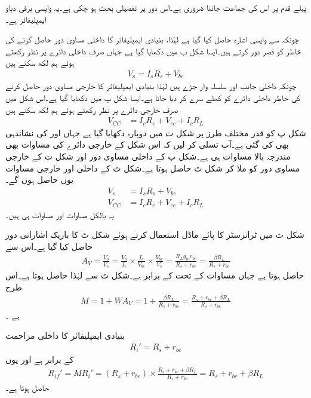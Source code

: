 پہلے قدم پر اس کی جماعت جاننا ضروری ہے۔اس دور پر تفصیلی بحث ہو چکی ہے۔یہ واپسی برقی دباو ایمپلیفائر ہے۔

چونکہ  سے واپسی اشارہ حاصل کیا گیا ہے لہٰذا، بنیادی ایمپلیفائر کا داخلی مساوی دور حاصل کرنے کی خاطر  کو قصر دور کرتے ہیں۔ایسا شکل  ب میں دکھایا گیا ہے جہاں صرف داخلی دائرے پر نظر رکھتے ہوئے ہم لکھ سکتے ہیں
\begin{align} \label{مساوات_واپسی_برقی_دباو_داخلی_مساوی}
V_s = I_s R_s +V_{be}
\end{align}
چونکہ داخلی جانب  اور  سلسلہ وار جڑے ہیں لہٰذا بنیادی ایمپلیفائر کا خارجی مساوی دور حاصل کرنے کی خاطر داخلی دائرے کو کھلے سرے کر دیا جاتا ہے۔ایسا شکل  پ میں دکھایا گیا ہے۔اس شکل میں صرف خارجی دائرے پر نظر رکھتے ہوئے ہم لکھ سکتے ہیں
\begin{align} \label{مساوات_واپسی_برقی_دباو_خارجی_مساوی}
V_{CC} &= I_c R_c+V_{ce}+I_c R_L 
\end{align}
شکل  پ کو قدر مختلف طرز پر شکل  ت میں دوبارہ دکھایا گیا ہے جہاں  اور  کی نشاندہی بھی کی گئی ہے۔آپ تسلی کر لیں کہ اس شکل کے 
خارجی دائرے کی مساوات  بھی مندرجہ بالا مساوات ہی ہے۔شکل  ب کے داخلی مساوی دور اور شکل  ت کے خارجی مساوی دور کو ملا کر شکل  ٹ حاصل ہوتا ہے۔شکل  ٹ کے داخلی اور خارجی مساوات یوں حاصل ہوں گے۔
\begin{align}
V_s &= I_s R_s +V_{be}\\
V_{CC} &= I_c R_c+V_{ce}+I_c R_L
\end{align}
یہ بالکل مساوات  اور مساوات  ہی ہیں۔

شکل  ث میں ٹرانزسٹر کا پائے ماڈل استعمال کرتے ہوئے شکل  ٹ کا باریک اشاراتی دور حاصل کیا گیا ہے۔اس سے
\begin{align} \label{مساوات_واپسی_ٹرانزسٹر_تابع_مخارج_افزائش}
A_V=\frac{V_o}{V_s}=\frac{V_o}{I_c} \times \frac{I_c}{V_{be}} \times \frac{V_{be}}{V_s}=\frac{R_L g_m r_{be}}{R_s+r_{be}}=\frac{\beta R_L}{R_s+r_{be}}
\end{align}
حاصل ہوتا ہے جہاں مساوات  کے تحت  کے برابر ہے۔شکل  ٹ سے    لہٰذا  حاصل ہوتا ہے۔اس طرح
\begin{align}
M=1+W A_V=1+\frac{\beta R_L}{R_s+r_{be}}=\frac{R_s+r_{be}+\beta R_L}{R_s+r_{be}}
\end{align}
ہے ۔

بنیادی ایمپلیفائر کا داخلی مزاحمت
\begin{align}
R_i'=R_s+r_{be}
\end{align}
کے برابر ہے اور یوں
\begin{align}
R_{if}'=M R_i' =\left (R_s+r_{be} \right) \times \frac{R_s+r_{be}+\beta R_L}{R_s+r_{be}}=R_s+r_{be}+\beta R_L
\end{align}
حاصل ہوتا ہے۔

